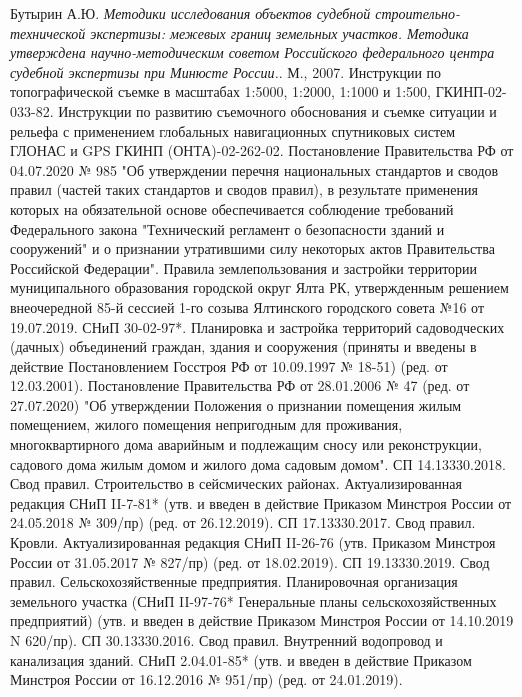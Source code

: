\begin{thebibliography}{99}
\bibitem{}Бутырин А.Ю. \textit{Методики исследования объектов судебной строительно-технической экспертизы: межевых границ земельных участков. Методика утверждена научно-методическим советом Российского федерального центра судебной экспертизы при Минюсте России.}. М., 2007.    
\bibitem{}Инструкции по топографической съемке в масштабах 1:5000, 1:2000, 1:1000 и 1:500, ГКИНП-02-033-82.
\bibitem{}Инструкции по развитию съемочного обоснования и съемке ситуации и рельефа с применением глобальных навигационных спутниковых систем ГЛОНАС и GPS ГКИНП (ОНТА)-02-262-02.
\bibitem{}	Постановление Правительства РФ от 04.07.2020 № 985 "Об утверждении перечня национальных стандартов и сводов правил (частей таких стандартов и сводов правил), в результате применения которых на обязательной основе обеспечивается соблюдение требований Федерального закона "Технический регламент о безопасности зданий и сооружений" и о признании утратившими силу некоторых актов Правительства Российской Федерации".
\bibitem{}	Правила землепользования и застройки территории муниципального образования городской округ Ялта РК, утвержденным решением внеочередной 85-й сессией 1-го созыва Ялтинского городского совета №16 от 19.07.2019.
\bibitem{}	СНиП 30-02-97*. Планировка и застройка территорий садоводческих (дачных) объединений граждан, здания и сооружения (приняты и введены в действие Постановлением Госстроя РФ от 10.09.1997 № 18-51) (ред. от 12.03.2001).
\bibitem{}	Постановление Правительства РФ от 28.01.2006 № 47 (ред. от 27.07.2020) "Об утверждении Положения о признании помещения жилым помещением, жилого помещения непригодным для проживания, многоквартирного дома аварийным и подлежащим сносу или реконструкции, садового дома жилым домом и жилого дома садовым домом".
\bibitem{}	СП 14.13330.2018. Свод правил. Строительство в сейсмических районах. Актуализированная редакция СНиП II-7-81* (утв. и введен в действие Приказом Минстроя России от 24.05.2018 № 309/пр) (ред. от 26.12.2019).
\bibitem{}	СП 17.13330.2017. Свод правил. Кровли. Актуализированная редакция СНиП II-26-76 (утв. Приказом Минстроя России от 31.05.2017 № 827/пр) (ред. от 18.02.2019).
\bibitem{}	СП 19.13330.2019. Свод правил. Сельскохозяйственные предприятия. Планировочная организация земельного участка (СНиП II-97-76* Генеральные планы сельскохозяйственных предприятий) (утв. и введен в действие Приказом Минстроя России от 14.10.2019 N 620/пр).
\bibitem{}	СП 30.13330.2016. Свод правил. Внутренний водопровод и канализация зданий. СНиП 2.04.01-85* (утв. и введен в действие Приказом Минстроя России от 16.12.2016 № 951/пр) (ред. от 24.01.2019).

\end{thebibliography}
